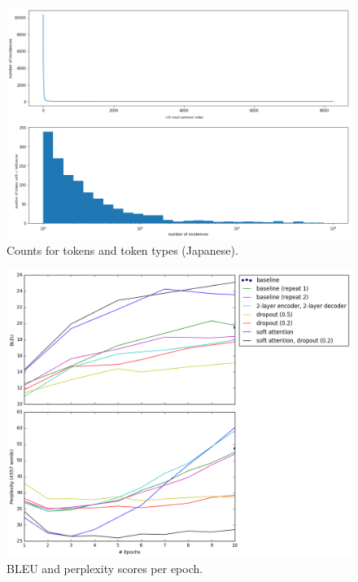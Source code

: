 \documentclass[answers]{exam}
\begin{document}
\begin{CJK}{UTF8}{min}
\begin{figure}
  \centering
  \includegraphics[width=\linewidth]{fig-toks-fr}
  \caption{Counts for tokens and token types (Japanese).}
  \label{fig:toks-fr}
\end{figure}

\begin{figure}
  \centering
  \includegraphics[width=\linewidth]{fig-bleu-pplx}
  \caption{BLEU and perplexity scores per epoch.}
  \label{fig:toks-fr}
\end{figure}

\end{CJK}
\end{document}
